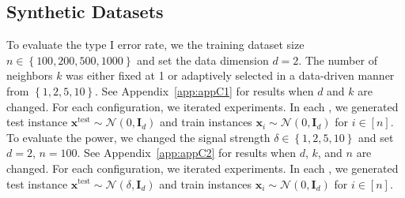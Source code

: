 \subsection{Synthetic Datasets}
\label{subsec:experiment_of_synthetic_data}
%
To evaluate the type I error rate, we  the training dataset size $n \in \left\{100, 200, 500, 1000\right\}$ and set the data dimension $d=2$. The number of neighbors $k$ was either fixed at 1 or adaptively selected in a data-driven manner from $\left\{1,2,5,10\right\}$.
%
See Appendix~\ref{app:appC1} for results when $d$ and $k$ are changed.
%
For each configuration, we iterated  experiments.
%
In each , we generated test instance $\bm{x}^{\text{test}} \sim  \mathcal{N}(0, \bm{I}_{d})$ and train instances $\bm{x}_i \sim  \mathcal{N}(0, \bm{I}_{d})$ for $i \in [n]$.
%
To evaluate the power, we changed the signal strength $\delta \in \left\{1, 2, 5, 10\right\}$ and set $d=2$, $n=100$. 
%
%
See Appendix~\ref{app:appC2} for results when $d$, $k$, and $n$ are changed.
%
For each configuration, we iterated  experiments.
%
In each , we generated test instance $\bm{x}^{\text{test}} \sim  \mathcal{N}(\delta, \bm{I}_{d})$ and train instances $\bm{x}_i \sim  \mathcal{N}(0, \bm{I}_{d})$ for $i \in [n]$.
%

